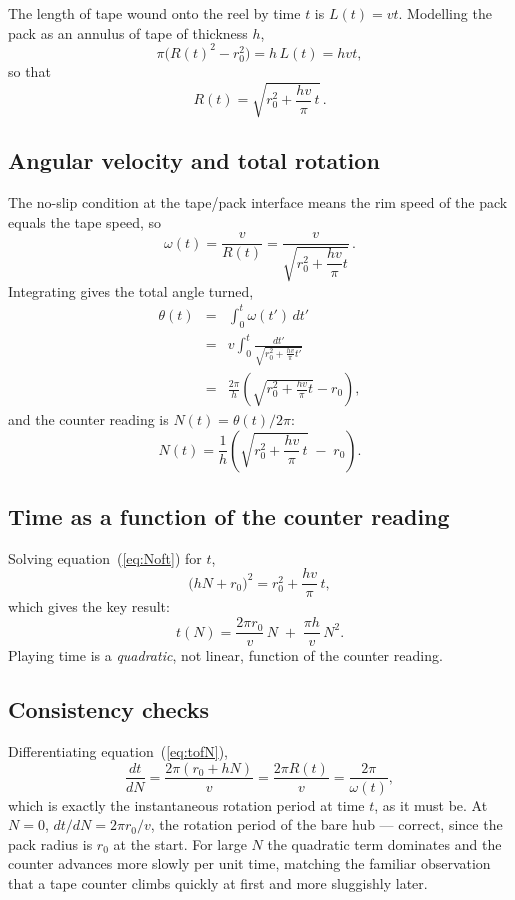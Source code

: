 \documentclass[12pt,oneside,a4paper]{article}
\newcommand{\be}{\begin{equation}}
\newcommand{\ee}{\end{equation}}
\newcommand{\bea}{\begin{eqnarray}}
\newcommand{\eea}{\end{eqnarray}}
\begin{document}
The length of tape wound onto the reel by time $t$ is $L(t) = vt$.
Modelling the pack as an annulus of tape of thickness $h$,
\be
\pi\bigl(R(t)^2 - r_0^2\bigr) = h\,L(t) = h v t,
\ee
so that
\be
R(t) = \sqrt{r_0^2 + \frac{hv}{\pi}\,t}\,.
\label{eq:radius}
\ee

\subsection{Angular velocity and total rotation}

The no-slip condition at the tape/pack interface means the rim speed
of the pack equals the tape speed, so
\be
\omega(t) = \frac{v}{R(t)} = \frac{v}{\sqrt{r_0^2 + \dfrac{hv}{\pi}t}}\,.
\ee
Integrating gives the total angle turned,
\bea
\theta(t) &=& \int_0^t \omega(t')\,dt' \nonumber\\
          &=& v\int_0^t \frac{dt'}{\sqrt{r_0^2 + \frac{hv}{\pi}t'}} \nonumber\\
          &=& \frac{2\pi}{h}\left(\sqrt{r_0^2+\frac{hv}{\pi}t} - r_0\right),
\eea
and the counter reading is $N(t) = \theta(t)/2\pi$:
\be
N(t) = \frac{1}{h}\left(\sqrt{r_0^2 + \frac{hv}{\pi}\,t}\; -\; r_0\right).
\label{eq:Noft}
\ee

\subsection{Time as a function of the counter reading}

Solving equation~(\ref{eq:Noft}) for $t$,
\be
\bigl(hN + r_0\bigr)^2 = r_0^2 + \frac{hv}{\pi}\,t,
\ee
which gives the key result:
\be
t(N) = \frac{2\pi r_0}{v}\,N \;+\; \frac{\pi h}{v}\,N^2.
\label{eq:tofN}
\ee
Playing time is a \emph{quadratic}, not linear, function of the
counter reading.

\subsection{Consistency checks}

Differentiating equation~(\ref{eq:tofN}),
\be
\frac{dt}{dN} = \frac{2\pi(r_0+hN)}{v} = \frac{2\pi R(t)}{v} = \frac{2\pi}{\omega(t)},
\ee
which is exactly the instantaneous rotation period at time $t$, as it
must be. At $N=0$, $dt/dN = 2\pi r_0/v$, the rotation period of the
bare hub --- correct, since the pack radius is $r_0$ at the start.
For large $N$ the quadratic term dominates and the counter advances
more slowly per unit time, matching the familiar observation that a
tape counter climbs quickly at first and more sluggishly later.
\end{document}
